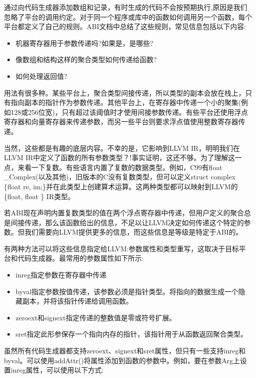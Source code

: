 通过向代码生成器添加数组和记录，有时生成的代码不会按预期执行,原因是我们忽略了平台的调用约定。对于同一个程序或库中的函数如何调用另一个函数，每个平台都定义了自己的规则。ABI文档中总结了这些规则，常见信息包括以下内容:

\begin{itemize}
\item
机器寄存器用于参数传递吗?如果是，是哪些?

\item
像数组和结构这样的聚合类型如何传递给函数?

\item
如何处理返回值?
\end{itemize}

用法有很多种。某些平台上，聚合类型间接传递，所以类型的副本会放在栈上，只有指向副本的指针作为参数传递。其他平台上，在寄存器中传递一个小的聚集(例如128或256位宽)，只有超过该阈值时才使用间接参数传递。有些平台还使用浮点寄存器和向量寄存器来传递参数，而另一些平台则要求浮点值使用整数寄存器传递。

当然，这些都是有趣的底层内容。不幸的是，它影响到LLVM IR，明明我们在LLVM IR中定义了函数的所有参数类型？!事实证明，这还不够。为了理解这一点，来看一下复数。有些语言内置了复数的数据类型。例如，C99有float \_Complex(以及其他)，旧版本的C没有复数类型，但可以定义struct complex \{float re, im;\}并在此类型上创建算术运算。这两种类型都可以映射到LLVM的\{float, float \} IR类型。

若ABI现在声明内置复数类型的值在两个浮点寄存器中传递，但用户定义的聚合总是间接传递，那么该函数给出的信息，不足以让LLVM决定如何传递这个特定的参数。但我们需要向LLVM提供更多的信息，而这些信息是等级是特定于ABI的。

有两种方法可以将这些信息指定给LLVM:参数属性和类型重写，这取决于目标平台和代码生成器。最常用的参数属性如下所示:

\begin{itemize}
\item
inreg指定参数在寄存器中传递

\item
byval指定参数按值传递，该参数必须是指针类型。将指向的数据生成一个隐藏副本，并将该指针传递给调用函数。

\item
zeroext和signext指定传递的整数值是零或符号扩展。

\item
sret指定此形参保存一个指向内存的指针，该指针用于从函数返回聚合类型。
\end{itemize}

虽然所有代码生成器都支持zeroext、signext和sret属性，但只有一些支持inreg和byval。可以使用addAttr()将属性添加到函数的参数中。例如，要在参数Arg上设置inreg属性，可以使用以下方式:

